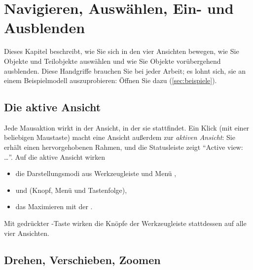 \chapter{Navigieren, Auswählen, Ein- und Ausblenden}\label{kap:navigation}

Dieses Kapitel beschreibt, wie Sie sich in den vier Ansichten bewegen, wie Sie Objekte und
Teilobjekte auswählen und wie Sie Objekte vorübergehend ausblenden. Diese Handgriffe brauchen
Sie bei jeder Arbeit; es lohnt sich, sie an einem Beispielmodell auszuprobieren:
Öffnen Sie dazu  (\autoref{sec:beispiele}).

\section{Die aktive Ansicht}\label{sec:aktive-ansicht}

Jede Mausaktion wirkt in der Ansicht, in der sie stattfindet. Ein Klick (mit einer
beliebigen Maustaste) macht eine Ansicht außerdem zur \emph{aktiven Ansicht}: Sie erhält einen
hervorgehobenen Rahmen, und die Statusleiste zeigt \enquote{Active view: \dots}. Auf die aktive
Ansicht wirken

\begin{itemize}
  \item die Darstellungsmodi aus Werkzeugleiste und Menü ,
  \item {} und  (Knopf, Menü und Tastenfolge),
  \item das Maximieren mit der .
\end{itemize}

Mit gedrückter -Taste wirken die Knöpfe der Werkzeugleiste stattdessen auf alle
vier Ansichten.

\section{Drehen, Verschieben, Zoomen}\label{sec:orbit-pan-zoom}

